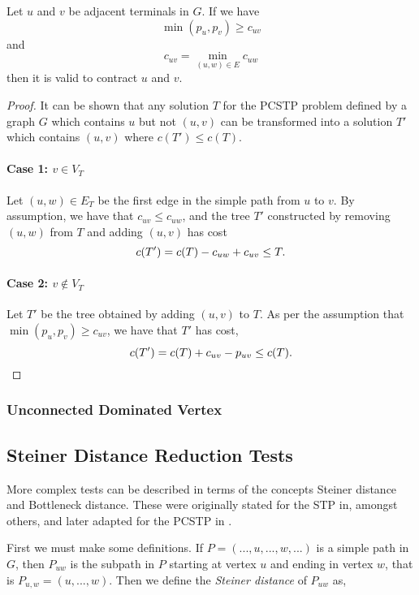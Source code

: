 \begin{theorem}
  Let $u$ and $v$ be adjacent terminals in $G$. If we have
  $$\min(p_u, p_v) \geq c_{uv}$$
  and
  $$c_{uv} = \min_{(u, w) \in E}c_{uw}$$
  then it is valid to contract $u$ and $v$.
\end{theorem}
\begin{proof}
  It can be shown that any solution $T$ for the PCSTP problem defined by a graph $G$
  which contains $u$ but not $(u,v)$ can
  be transformed into a solution $T'$ which contains $(u,v)$ where $c(T') \leq c(T)$.

  \paragraph{Case 1: $v \in V_T$}
  Let $(u, w) \in E_T$ be the first edge in the simple path from $u$ to $v$. By assumption, we
  have that $c_{uv} \leq c_{uw}$, and the tree $T'$ constructed by removing $(u,w)$ from $T$ and
  adding $(u,v)$ has cost
  $$c(T') = c(T) - c_{uw} + c_{uv} \leq T\mathnormal{.}$$
  \paragraph{Case 2: $v  \not\in V_T$}
  Let $T'$ be the tree obtained by adding $(u,v)$ to $T$. As per the assumption that $\min(p_u, p_v) \geq c_{uv}$,
  we have that $T'$ has cost,
  $$c(T') = c(T) + c_{uv} - p_{uv} \leq c(T)\mathnormal{.}$$
\end{proof}

\subsubsection{Unconnected Dominated Vertex}


\subsection{Steiner Distance Reduction Tests}
More complex tests can be described in terms
of the concepts Steiner distance and Bottleneck distance. These were originally stated for
the STP in, amongst others, \cite{duin1989edge,duin1989reduction} and later
adapted for the PCSTP in \cite{uchoa2006reduction}.

First we must make some definitions.
If $P = (..., u, ..., w, ...)$ is a simple path in $G$, then $P_{uw}$ is
the subpath in $P$ starting at vertex $u$ and ending in vertex $w$,
that is $P_{u,w} = (u, ...,w)$. Then we define the \textit{Steiner distance} of
 $P_{uw}$ as,

